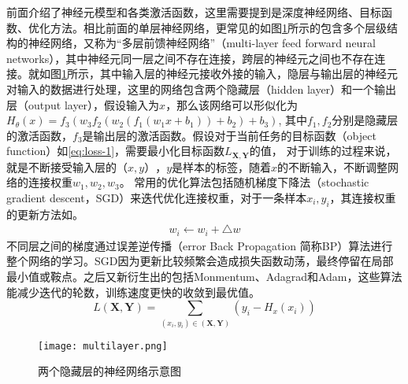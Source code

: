 前面介绍了神经元模型和各类激活函数，这里需要提到是深度神经网络、目标函数、优化方法。相比前面的单层神经网络，更常见的如图\ref{fig:mnn-example}所示的包含多个层级结构的神经网络，又称为``多层前馈神经网络''（multi-layer feed forward neural networks），其中神经元同一层之间不存在连接，跨层的神经元之间也不存在连接。就如图\ref{fig:mnn-example}所示，其中输入层的神经元接收外接的输入，隐层与输出层的神经元对输入的数据进行处理，这里的网络包含两个隐藏层（hidden layer）和一个输出层（output layer），假设输入为$x$，那么该网络可以形似化为
$H_{\theta}(x) = f_3(w_{3}f_2(w_{2}(f_{1}(w_{1}x+b_1))+b_2)+b_3)$, 其中$f_{1},f_{2}$分别是隐藏层的激活函数，$f_{3}$是输出层的激活函数。假设对于当前任务的目标函数（object function）如\ref{eq:loss-1}，需要最小化目标函数$L_{\mathbf{X},\mathbf{Y}}$的值， 对于训练的过程来说，就是不断接受输入层的$（x,y）$，$y$是样本的标签，随着$x$的不断输入，不断调整网络的连接权重$w_1,w_2,w_3$。 常用的优化算法包括随机梯度下降法（stochastic gradient descent，SGD）来迭代优化连接权重，对于一条样本$x_{i},y_{i}$，其连接权重的更新方法如。
\begin{equation}
    \begin{split}
        w_i  \leftarrow w_i +\bigtriangleup w
    \end{split}
\end{equation}
不同层之间的梯度通过误差逆传播（error Back Propagation 简称BP）\cite{rumelhart1988learning}算法进行整个网络的学习。SGD因为更新比较频繁会造成损失函数动荡，最终停留在局部最小值或鞍点。之后又新衍生出的包括Monmentum、Adagrad\cite{duchi2011adaptive}和Adam\cite{kingma2014adam}，这些算法能减少迭代的轮数，训练速度更快的收敛到最优值。
\begin{equation}\label{eq:loss-1}
    L(\mathbf{X},\mathbf{Y}) = \sum_{(x_i,y_i) \in (\mathbf{X},\mathbf{Y})}(y_{i} - H_{x}(x_{i}))
\end{equation}

\begin{figure}[htpb]
	\centering
	\texttt{[image: multilayer.png]}
    \caption{两个隐藏层的神经网络示意图}
	\vspace*{-3.5mm}
	\label{fig:mnn-example}
\end{figure}


